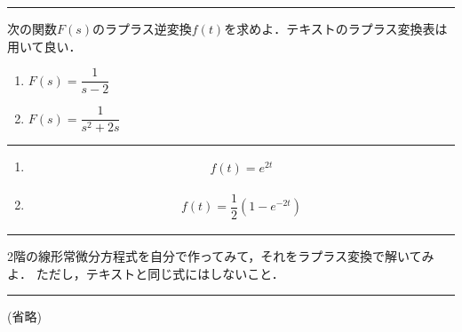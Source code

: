 \documentclass[11pt,a4]{jsarticle}
\numberwithin{equation}{section}
\begin{document}
\newpage
%
\hrule
\enshu
%
次の関数$F(s)$のラプラス逆変換$f(t)$を求めよ．テキストのラプラス変換表は用いて良い．
\begin{enumerate}[(1)]
  \item $F(s) = \dfrac{1}{s-2}$
  \item $F(s) = \dfrac{1}{s^2+2s}$
\end{enumerate}
\hrule
\vspace*{.2cm}
%
\begin{enumerate}[(1)]
  \item 
    \begin{align*}
      f(t) = e^{2t} 
    \end{align*}
  \item
    \begin{align*}
      f(t) = \dfrac{1}{2}\left(1-e^{-2t}\right) 
    \end{align*}
\end{enumerate}
%
\newpage
%
\hrule
\enshu
%
2階の線形常微分方程式を自分で作ってみて，それをラプラス変換で解いてみよ．
ただし，テキストと同じ式にはしないこと．
%
\vspace*{.2cm}
\hrule
\vspace*{.2cm}
(省略)
\end{document}
